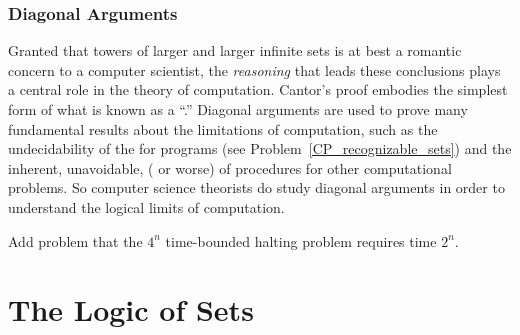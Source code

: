\subsubsection{Diagonal Arguments}

Granted that towers of larger and larger infinite sets is at best a
romantic concern to a computer scientist, the \emph{reasoning} that
leads these conclusions plays a central role in the theory of
computation.  Cantor's proof embodies the simplest form of what is
known as a ``.''  Diagonal arguments are used
to prove many fundamental results about the limitations of
computation, such as the undecidability of the 
for programs (see Problem~\ref{CP_recognizable_sets}) and the
inherent, unavoidable,  ( or
worse) of procedures for other computational problems.  So computer
science theorists do study diagonal arguments in order to understand
the logical limits of computation.

\begin{problems}
\practiceproblems

\classproblems
{}








\begin{editingnotes}
Add problem that the $4^n$ time-bounded halting problem requires time
$2^n$.
\end{editingnotes}


\homeworkproblems


\end{problems}


\section{The Logic of Sets}%

